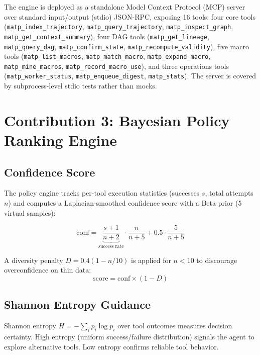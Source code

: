 \documentclass[lettersize,journal]{IEEEtran}
\begin{document}
The engine is deployed as a standalone Model Context Protocol (MCP) server over standard input/output (stdio) JSON-RPC, exposing 16 tools: four core tools (\texttt{matp\_index\_trajectory}, \texttt{matp\_query\_trajectory}, \texttt{matp\_inspect\_graph}, \texttt{matp\_get\_context\_summary}), four DAG tools (\texttt{matp\_get\_lineage}, \texttt{matp\_query\_dag}, \texttt{matp\_confirm\_state}, \texttt{matp\_recompute\_validity}), five macro tools (\texttt{matp\_list\_macros}, \texttt{matp\_match\_macro}, \texttt{matp\_expand\_macro}, \texttt{matp\_mine\_macros}, \texttt{matp\_record\_macro\_use}), and three operations tools (\texttt{matp\_worker\_status}, \texttt{matp\_enqueue\_digest}, \texttt{matp\_stats}). The server is covered by subprocess-level stdio tests rather than mocks.

\section{Contribution 3: Bayesian Policy Ranking Engine}

\subsection{Confidence Score}

The policy engine tracks per-tool execution statistics (successes $s$, total attempts $n$) and computes a Laplacian-smoothed confidence score with a Beta prior (5 virtual samples):

\begin{equation}
\label{eq:conf}
\text{conf} = \underbrace{\frac{s+1}{n+2}}_{\text{success rate}} \cdot \frac{n}{n+5} + 0.5 \cdot \frac{5}{n+5}
\end{equation}

A diversity penalty $D = 0.4(1 - n/10)$ is applied for $n < 10$ to discourage overconfidence on thin data:
\begin{equation}
\text{score} = \text{conf} \times (1 - D)
\end{equation}

\subsection{Shannon Entropy Guidance}

Shannon entropy $H = -\sum_i p_i \log p_i$ over tool outcomes measures decision certainty. High entropy (uniform success/failure distribution) signals the agent to explore alternative tools. Low entropy confirms reliable tool behavior.
\end{document}
